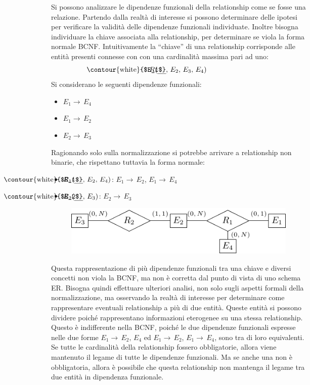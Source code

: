 \documentclass{article}
\numberwithin{equation}{subsection}
\newcommand{\myuline}[1]{%
  \uline{\phantom{#1}}%
  \llap{\contour{white}{#1}}%
}
\begin{document}
Si possono analizzare le dipendenze funzionali della relationship come se fosse una relazione. Partendo dalla realtà di interesse si possono determinare delle ipotesi 
per verificare la validità delle dipendenze funzionali individuate. Inoltre bisogna individuare la chiave associata alla relationship, per determinare se viola 
la forma normale BCNF. Intuitivamente la ``chiave'' di una relationship corrisponde alle entità presenti connesse con con una cardinalità massima pari ad uno:
\begin{equation*}
    R(\text{\myuline{$E_1$}},\,E_2,\,E_3,\,E_4)
\end{equation*}
Si considerano le seguenti dipendenze funzionali:
\begin{itemize}
    \item $E_1\to\,E_4$
    \item $E_1\to\,E_2$
    \item $E_2\to\,E_3$
\end{itemize}

Ragionando solo sulla normalizzazione si potrebbe arrivare a relationship non binarie, che rispettano tuttavia la forma normale:
\begin{itemize}
    \item $R_1(\text{\myuline{$E_1$}},\,E_2,\,E_4)$: $E_1\to\,E_2$, $E_1\to\,E_4$
    \item $R_2(\text{\myuline{$E_2$}},\,E_3)$: $E_2\to\,E_3$
\end{itemize}

\begin{figure}[H]%
    \centering%
    \includegraphics[scale=1.2]{normalizzazione_relationship_quaternaria.pdf}%
\end{figure}

Questa rappresentazione di più dipendenze funzionali tra una chiave e diversi concetti non viola la BCNF, ma non è corretta dal punto di vista di uno schema ER. Bisogna quindi effettuare ulteriori 
analisi, non solo sugli aspetti formali della normalizzazione, ma osservando la realtà di interesse per determinare come rappresentare eventuali relationship a più 
di due entità. 
Queste entità si possono dividere poiché rappresentano informazioni eterogenee su una stessa relationship. Questo è indifferente nella BCNF, poiché le due dipendenze funzionali espresse nelle due forme $E_1\to\,E_2,\,E_4$ ed $E_1\to\,E_2$, $E_1\to\,E_4$, sono tra di loro equivalenti. 
Se tutte le cardinalità della relationship fossero obbligatorie, allora viene mantenuto il legame di tutte le dipendenze funzionali. Ma se anche una non è obbligatoria, 
allora è possibile che questa relationship non mantenga il legame tra due entità in dipendenza funzionale. 
\end{document}
